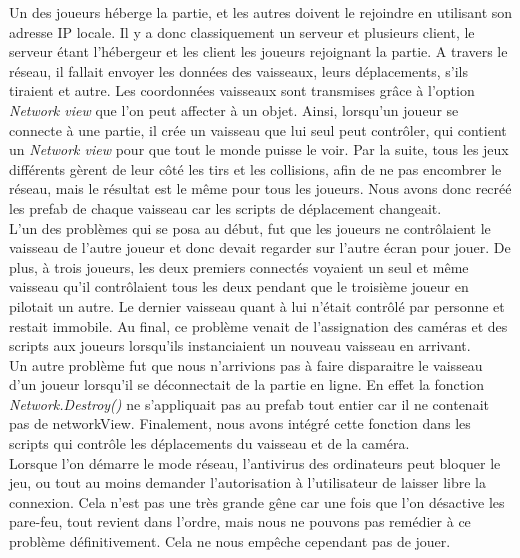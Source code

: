 \documentclass[12pt, titlepage]{article}
\begin{document}
\begin{spacing}{1.5}
Un des joueurs héberge la partie, et les autres doivent le rejoindre en utilisant son adresse IP locale. Il y a donc classiquement un serveur et plusieurs client, le serveur étant l'hébergeur et les client les joueurs rejoignant la partie. A travers le réseau, il fallait envoyer les données des vaisseaux, leurs déplacements, s'ils tiraient et autre. Les coordonnées vaisseaux sont transmises grâce à l'option \textit{Network view} que l'on peut affecter à un objet. Ainsi, lorsqu'un joueur se connecte à une partie, il crée un vaisseau que lui seul peut contrôler, qui contient un \textit{Network view} pour que tout le monde puisse le voir. Par la suite, tous les jeux différents gèrent de leur côté les tirs et les collisions, afin de ne pas encombrer le réseau, mais le résultat est le même pour tous les joueurs. Nous avons donc recréé les prefab de chaque vaisseau car les scripts de déplacement changeait.\\

L'un des problèmes qui se posa au début, fut que les joueurs ne contrôlaient le vaisseau de l'autre joueur et donc devait regarder sur l'autre écran pour jouer. De plus, à trois joueurs, les deux
premiers connectés voyaient un seul et même vaisseau qu'il contrôlaient tous les deux pendant que le troisième joueur en pilotait un autre. Le dernier vaisseau quant à lui n'était contrôlé par personne et restait immobile. Au final, ce problème venait de l'assignation des caméras et des scripts aux joueurs lorsqu'ils instanciaient un nouveau vaisseau en arrivant.\\

Un autre problème fut que nous n'arrivions pas à faire disparaitre le vaisseau d'un joueur lorsqu'il se déconnectait de la partie en ligne. En effet la fonction \textit{Network.Destroy()} ne s'appliquait pas au prefab tout entier car il ne contenait pas de networkView. Finalement, nous avons intégré cette fonction dans les scripts qui contrôle les déplacements du vaisseau et de la caméra.\\

Lorsque l'on démarre le mode réseau, l'antivirus des ordinateurs peut bloquer le jeu, ou tout au moins demander l'autorisation à l'utilisateur de laisser libre la connexion. Cela n'est pas une très grande gêne car une fois que l'on désactive les pare-feu, tout revient dans l'ordre, mais nous ne pouvons pas remédier à ce problème définitivement. Cela ne nous empêche cependant pas de jouer.\\

\newpage

\end{spacing}
\end{document}
